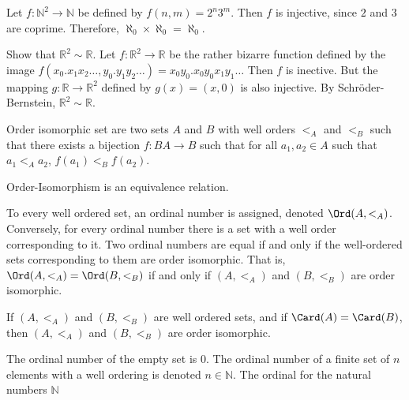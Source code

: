         \begin{example}
            Let $f:{\mathbb{N}^{2}}\rightarrow{\mathbb{N}}$
            be defined by $f(n,m)=2^{n}3^{m}$.
            Then $f$ is injective, since $2$ and $3$
            are coprime. Therefore,
            $\aleph_{0}\times\aleph_{0}=\aleph_{0}$.
        \end{example}
        \begin{example}
            Show that $\mathbb{R}^{2}\sim\mathbb{R}$.
            Let $f:\mathbb{R}^{2}\rightarrow\mathbb{R}$
            be the rather bizarre function defined by the image
            $f(x_{0}.x_{1}x_{2}\hdots,y_{0}.y_{1}y_{2}\hdots)%
             =x_{0}y_{0}.x_{0}y_{0}x_{1}y_{1}\hdots$ Then
            $f$ is inective. But the mapping
            $g:\mathbb{R}\rightarrow\mathbb{R}^{2}$
            defined by $g(x)=(x,0)$ is also injective.
            By Schr\"{o}der-Bernstein,
            $\mathbb{R}^{2}\sim\mathbb{R}$.
        \end{example}
        \begin{definition}
           Order isomorphic set are two sets $A$ and $B$
           with well orders $<_{A}$ and $<_{B}$ such that
           there exists a bijection $f:{B}A\rightarrow{B}$
           such that for all $a_{1},a_{2}\in{A}$ such that
           $a_{1}<_{A}a_{2}$, $f(a_{1})<_{B}f(a_{2})$.
        \end{definition}
        \begin{theorem}
           Order-Isomorphism is an equivalence relation.
        \end{theorem}
        To every well ordered set, an ordinal number is
        assigned, denoted $\Ord(A,<_{A})$. Conversely,
        for every ordinal number there is a set with a
        well order corresponding to it. Two ordinal numbers
        are equal if and only if the well-ordered sets
        corresponding to them are order isomorphic.
        That is,
        $\Ord(A,<_{A})=\Ord(B,<_{B})$ if and only if
        $(A,<_{A})$ and $(B,<_{B})$ are order isomorphic.
        \begin{theorem}
           If $(A,<_{A})$ and $(B,<_{B})$ are well ordered
           sets, and if $\Card(A)=\Card(B)$, then
           $(A,<_{A})$ and $(B,<_{B})$ are order
           isomorphic.
        \end{theorem}
        The ordinal number of the empty set is $0$. The
        ordinal number of a finite set of $n$ elements with
        a well ordering is denoted $n\in\mathbb{N}$.
        The ordinal for the natural numbers $\mathbb{N}$
